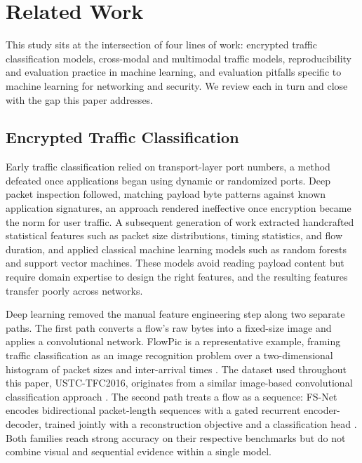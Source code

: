 \documentclass[journal]{IEEEtran}
\begin{document}
\section{Related Work}

This study sits at the intersection of four lines of work: encrypted traffic classification models, cross-modal and multimodal traffic models, reproducibility and evaluation practice in machine learning, and evaluation pitfalls specific to machine learning for networking and security. We review each in turn and close with the gap this paper addresses.

\subsection{Encrypted Traffic Classification}

Early traffic classification relied on transport-layer port numbers, a method defeated once applications began using dynamic or randomized ports. Deep packet inspection followed, matching payload byte patterns against known application signatures, an approach rendered ineffective once encryption became the norm for user traffic. A subsequent generation of work extracted handcrafted statistical features such as packet size distributions, timing statistics, and flow duration, and applied classical machine learning models such as random forests and support vector machines. These models avoid reading payload content but require domain expertise to design the right features, and the resulting features transfer poorly across networks.

Deep learning removed the manual feature engineering step along two separate paths. The first path converts a flow's raw bytes into a fixed-size image and applies a convolutional network. FlowPic is a representative example, framing traffic classification as an image recognition problem over a two-dimensional histogram of packet sizes and inter-arrival times \cite{flowpic}. The dataset used throughout this paper, USTC-TFC2016, originates from a similar image-based convolutional classification approach \cite{ustc}. The second path treats a flow as a sequence: FS-Net encodes bidirectional packet-length sequences with a gated recurrent encoder-decoder, trained jointly with a reconstruction objective and a classification head \cite{fsnet}. Both families reach strong accuracy on their respective benchmarks but do not combine visual and sequential evidence within a single model.
\end{document}
